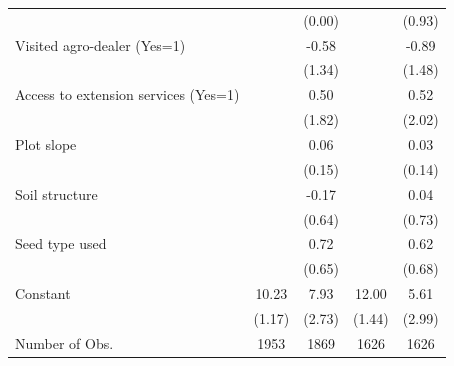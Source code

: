 {\begin{tabular}{l*{4}{c}}
                &                  &   (0.00)         &                  &   (0.93)         \\
Visited agro-dealer (Yes=1)&                  &    -0.58         &                  &    -0.89         \\
                &                  &   (1.34)         &                  &   (1.48)         \\
Access to extension services (Yes=1)&                  &     0.50         &                  &     0.52         \\
                &                  &   (1.82)         &                  &   (2.02)         \\
Plot slope      &                  &     0.06         &                  &     0.03         \\
                &                  &   (0.15)         &                  &   (0.14)         \\
Soil structure  &                  &    -0.17         &                  &     0.04         \\
                &                  &   (0.64)         &                  &   (0.73)         \\
Seed type used  &                  &     0.72         &                  &     0.62         \\
                &                  &   (0.65)         &                  &   (0.68)         \\
Constant        &    10.23\sym{***}&     7.93\sym{***}&    12.00\sym{***}&     5.61\sym{*}  \\
                &   (1.17)         &   (2.73)         &   (1.44)         &   (2.99)         \\
\hline
Number of Obs.  &     1953         &     1869         &     1626         &     1626         \\
\hline\hline
\end{tabular}
}
